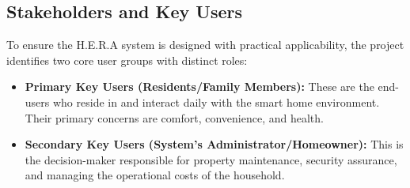 


\subsection{Stakeholders and Key Users}
To ensure the H.E.R.A system is designed with practical applicability, the project identifies two core user groups with distinct roles:

\begin{itemize}
    \item \textbf{Primary Key Users (Residents/Family Members):} These are the end-users who reside in and interact daily with the smart home environment. Their primary concerns are comfort, convenience, and health.
    \item \textbf{Secondary Key Users (System's Administrator/Homeowner):} This is the decision-maker responsible for property maintenance, security assurance, and managing the operational costs of the household.
\end{itemize}

